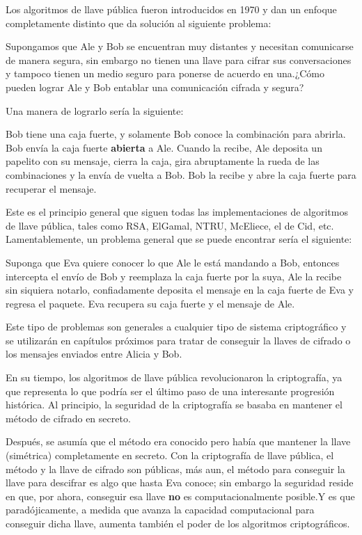 Los algoritmos de llave pública fueron introducidos en 1970 y dan un enfoque completamente distinto que da solución al siguiente problema:

Supongamos que Ale y Bob se encuentran muy distantes y necesitan comunicarse de manera segura, sin embargo no tienen una llave para cifrar sus conversaciones y tampoco tienen un medio seguro para ponerse de acuerdo en una.¿Cómo pueden lograr Ale y Bob entablar una comunicación cifrada y segura?

Una manera de lograrlo sería la siguiente: 

Bob tiene una caja fuerte, y solamente Bob conoce la combinación para abrirla. Bob envía la caja fuerte {\bf abierta}  a Ale. Cuando la recibe, Ale deposita un papelito con su mensaje, cierra la caja, gira abruptamente la rueda de las combinaciones y la envía de vuelta a Bob. Bob la recibe y abre la caja fuerte para recuperar el mensaje.

Este es el principio general que siguen todas las implementaciones de algoritmos de llave pública, tales como RSA, ElGamal, NTRU, McEliece, el de Cid, etc. Lamentablemente, un problema general que se puede encontrar sería el siguiente:

 Suponga que Eva quiere conocer lo que  Ale le está mandando a Bob, entonces intercepta el envío de Bob y reemplaza la caja fuerte por la suya, Ale la recibe sin siquiera notarlo, confiadamente deposita el mensaje en la caja fuerte de Eva y regresa el paquete. Eva recupera su caja fuerte y el mensaje de Ale. 
 
 Este tipo de problemas son generales a cualquier tipo de sistema criptográfico y se utilizarán en capítulos próximos para tratar de conseguir la llaves de cifrado o los mensajes enviados entre Alicia y Bob.
  
 En su tiempo, los algoritmos de llave pública revolucionaron la criptografía, ya que representa  lo que podría ser el último paso de una interesante progresión histórica. Al principio, la seguridad de la criptografía se basaba en mantener el método de cifrado en secreto. 
 
 Después, se asumía que el método era conocido pero había que mantener la llave (simétrica) completamente en secreto. Con la criptografía de llave pública, el método y la llave de cifrado son públicas, más aun, el método para conseguir la llave para descifrar es algo que hasta Eva conoce; sin embargo la seguridad reside en que, por ahora, conseguir esa llave {\bf no} es computacionalmente posible.Y es que paradójicamente, a medida que avanza la capacidad computacional para conseguir dicha llave, aumenta también el poder de los algoritmos criptográficos.
 
